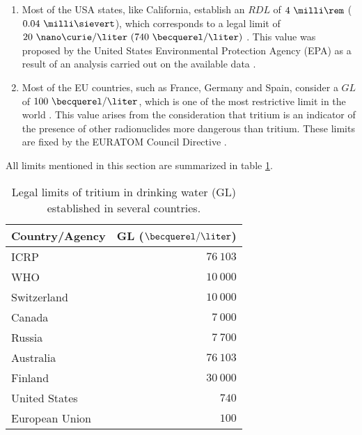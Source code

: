 \begin{enumerate}
\item{} Most of the USA states, like California, establish an $RDL$ of $4~\milli\rem$ ($0.04~\milli\sievert$), which corresponds to a legal limit of $20~\nano\curie/\liter~(740~\becquerel/\liter)$ \cite{California_GL}. This value was proposed by the United States Environmental Protection Agency (EPA) as a result of an analysis carried out on the available data \cite{USEPA_GL}.

\item{} Most of the EU countries, such as France, Germany and Spain, consider a $GL$ of $100~\becquerel/\liter$, which is one of the most restrictive limit in the world \cite{France_GL, Germany_GL, Spain_GL}. This value arises from the consideration that tritium is an indicator of the presence of other radionuclides more dangerous than tritium. These limits are fixed by the EURATOM Council Directive \cite{EURATOM_GL}. 
\end{enumerate}

All limits mentioned in this section are summarized in table \ref{tab:LegalLimitTritium}.

\begin{table}[htbp]
\centering{}%
\begin{tabular}{lr}
\toprule 
Country/Agency & GL ($\becquerel/\liter$) \tabularnewline
\midrule
\midrule 
ICRP & $76~103$ \tabularnewline
WHO & $10~000$ \tabularnewline
Switzerland & $10~000$ \tabularnewline
Canada & $7~000$ \tabularnewline
Russia & $7~700$ \tabularnewline
Australia & $76~103$ \tabularnewline
Finland & $30~000$ \tabularnewline
United States & $740$ \tabularnewline
European Union & $100$ \tabularnewline
\bottomrule
\end{tabular}
\caption{Legal limits of tritium in drinking water (GL) established in several countries.}
\label{tab:LegalLimitTritium}
\end{table}